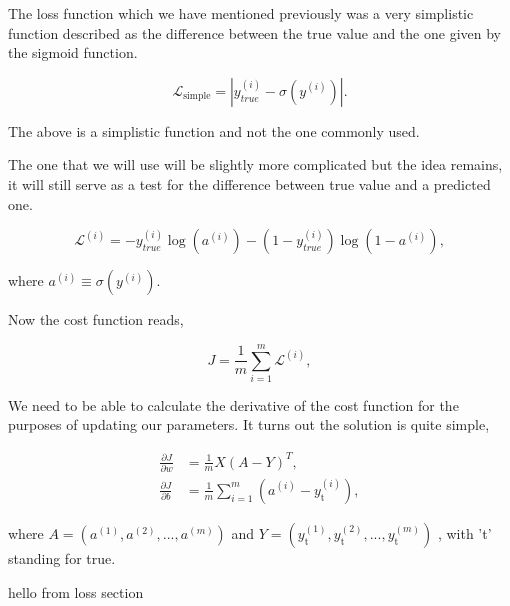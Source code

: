 The loss function which we have mentioned previously was a
very simplistic function described as the difference between
the true value and the one given by the sigmoid function.

\begin{equation}
    \mathscr{L}_{\text{simple}} = |y_{true}^{(i)} - \sigma(y^{(i)}) |.
\end{equation}

The above is a simplistic function and not the one commonly
used.

The one that we will use will be slightly more complicated
but the idea remains, it will still serve as a test for the
difference between true value and a predicted one.

\begin{equation}
    \mathscr{L}^{(i)} = -y_{true}^{(i)} \log (a^{(i)}) - (1 - y_{true}^{(i)})
    \log(1 - a^{(i)}),
\end{equation}

where $a^{(i)} \equiv \sigma(y^{(i)})$.

Now the cost function reads,

\begin{equation}
    J = \frac{1}{m} \sum_{i=1}^m \mathscr{L}^{(i)},
\end{equation}

We need to be able to calculate the derivative of the cost
function for the purposes of updating our parameters.  It
turns out the solution is quite simple,

\begin{align}
    \frac{\partial J}{\partial w} &= 
    \frac{1}{m}  X(A - Y)^T, \\
    \frac{\partial J}{\partial b} &=
    \frac{1}{m}
    \sum_{i=1}^m (a^{(i)} - y^{(i)}_{\text{t}}),
\end{align}

where $A = (a^{(1)}, a^{(2)},...,a^{(m)})$ and $Y =
(y^{(1)}_{\text{t}}, y^{(2)}_{\text{t}},...,
y^{(m)}_{\text{t}})$ , with 't' standing for true.

hello from loss section 
